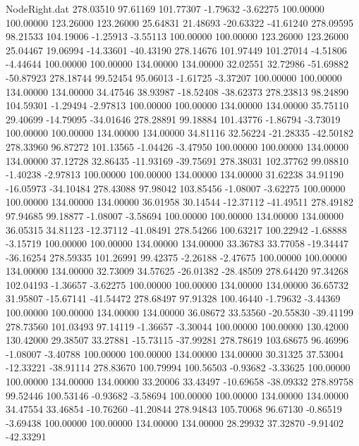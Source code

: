 \begin{filecontents}{NodeRight.dat}
 278.03510   97.61169  101.77307    -1.79632   -3.62275  100.00000  100.00000  123.26000  123.26000   25.64831   21.48693  -20.63322  -41.61240
 278.09595   98.21533  104.19006    -1.25913   -3.55113  100.00000  100.00000  123.26000  123.26000   25.04467   19.06994  -14.33601  -40.43190
 278.14676  101.97449  101.27014    -4.51806   -4.44644  100.00000  100.00000  134.00000  134.00000   32.02551   32.72986  -51.69882  -50.87923
 278.18744   99.52454   95.06013    -1.61725   -3.37207  100.00000  100.00000  134.00000  134.00000   34.47546   38.93987  -18.52408  -38.62373
 278.23813   98.24890  104.59301    -1.29494   -2.97813  100.00000  100.00000  134.00000  134.00000   35.75110   29.40699  -14.79095  -34.01646
 278.28891   99.18884  101.43776    -1.86794   -3.73019  100.00000  100.00000  134.00000  134.00000   34.81116   32.56224  -21.28335  -42.50182
 278.33960   96.87272  101.13565    -1.04426   -3.47950  100.00000  100.00000  134.00000  134.00000   37.12728   32.86435  -11.93169  -39.75691
 278.38031  102.37762   99.08810    -1.40238   -2.97813  100.00000  100.00000  134.00000  134.00000   31.62238   34.91190  -16.05973  -34.10484
 278.43088   97.98042  103.85456    -1.08007   -3.62275  100.00000  100.00000  134.00000  134.00000   36.01958   30.14544  -12.37112  -41.49511
 278.49182   97.94685   99.18877    -1.08007   -3.58694  100.00000  100.00000  134.00000  134.00000   36.05315   34.81123  -12.37112  -41.08491
 278.54266  100.63217  100.22942    -1.68888   -3.15719  100.00000  100.00000  134.00000  134.00000   33.36783   33.77058  -19.34447  -36.16254
 278.59335  101.26991   99.42375    -2.26188   -2.47675  100.00000  100.00000  134.00000  134.00000   32.73009   34.57625  -26.01382  -28.48509
 278.64420   97.34268  102.04193    -1.36657   -3.62275  100.00000  100.00000  134.00000  134.00000   36.65732   31.95807  -15.67141  -41.54472
 278.68497   97.91328  100.46440    -1.79632   -3.44369  100.00000  100.00000  134.00000  134.00000   36.08672   33.53560  -20.55830  -39.41199
 278.73560  101.03493   97.14119    -1.36657   -3.30044  100.00000  100.00000  130.42000  130.42000   29.38507   33.27881  -15.73115  -37.99281
 278.78619  103.68675   96.46996    -1.08007   -3.40788  100.00000  100.00000  134.00000  134.00000   30.31325   37.53004  -12.33221  -38.91114
 278.83670  100.79994  100.56503    -0.93682   -3.33625  100.00000  100.00000  134.00000  134.00000   33.20006   33.43497  -10.69658  -38.09332
 278.89758   99.52446  100.53146    -0.93682   -3.58694  100.00000  100.00000  134.00000  134.00000   34.47554   33.46854  -10.76260  -41.20844
 278.94843  105.70068   96.67130    -0.86519   -3.69438  100.00000  100.00000  134.00000  134.00000   28.29932   37.32870   -9.91402  -42.33291

\end{filecontents}
